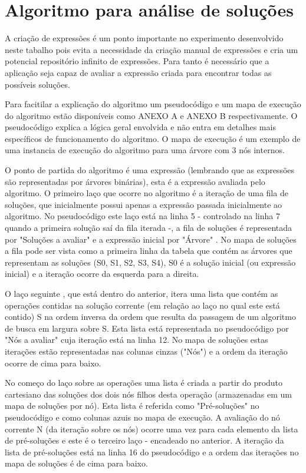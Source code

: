 \section{Algoritmo para análise de soluções}
A criação de expressões é um ponto importante no experimento desenvolvido neste tabalho pois evita a necessidade da criação manual de expressões e cria um potencial repositório infinito de expressões. Para tanto é necessário que a aplicação seja capaz de avaliar a expressão criada para encontrar todas as possíveis soluções.

  Para facitilar a explicação do algoritmo um pseudocódigo e um mapa de execução do algoritmo estão disponíveis como ANEXO A e ANEXO B respectivamente. O pseudocódigo explica a lógica geral envolvida e não entra em detalhes mais específicos de funcionamento do algoritmo. O mapa de execução é um exemplo de uma instancia de execução do algoritmo para uma árvore com 3 nós internos.

O ponto de partida do algoritmo é uma expressão (lembrando que as expressões são representadas por árvores binárias), esta é a expressão avaliada pelo algoritmo. O primeiro laço que ocorre no algoritmo é a iteração de uma fila de soluções, que inicialmente possui apenas a expressão passada inicialmente ao algoritmo. No pseudocódigo este laço está na linha 5 - controlado na linha 7 quando a primeira solução saí da fila iterada -, a fila de soluções é representada por "Soluções a avaliar" e a expressão inicial por "Árvore" . No mapa de soluções a fila pode ser vista como a primeira linha da tabela que contém as árvores que representam as soluções (S0, S1, S2, S3, S4), S0 é a solução inicial (ou expressão inicial) e a iteração ocorre da esquerda para a direita.

O laço seguinte , que está dentro do anterior, itera uma lista que contém as operações contidas na solução corrente (em relação ao laço no qual este está contido) S na ordem inversa da ordem que resulta da passagem de um algoritmo de busca em largura sobre S. Esta lista está representada no pseudocódigo por "Nós a avaliar" cuja iteração está na linha 12. No mapa de soluções estas iterações estão representadas nas colunas cinzas ("Nós") e a ordem da iteração ocorre de cima para baixo.

No começo do laço sobre as operações uma lista é criada a partir do produto cartesiano das soluções dos dois nós filhos desta operação (armazenadas em um mapa de soluções por nó). Esta lista é referida como "Pré-soluções" no pseudocódigo e como colunas azuis no mapa de execução. A avaliação do nó corrente N (da iteração sobre os nós) ocorre uma vez para cada elemento da lista de pré-soluções e este é o terceiro laço - encadeado no anterior. A iteração da lista de pré-soluções está na linha 16 do pseudocódigo e a ordem das iterações no mapa de soluções é de cima para baixo.

